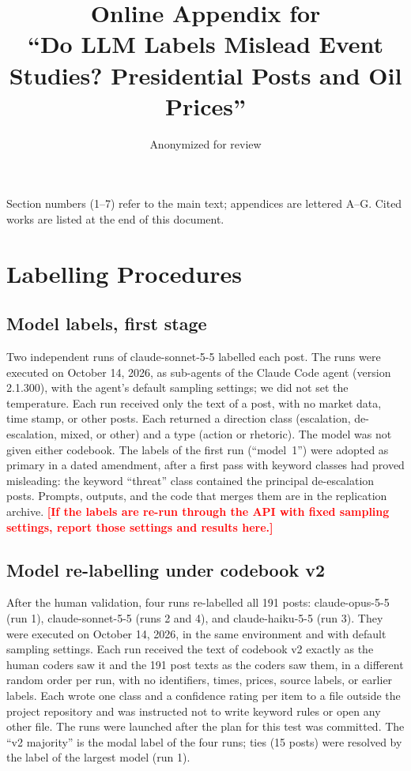 \documentclass[11pt]{article}
\title{Online Appendix for\\ ``Do LLM Labels Mislead Event Studies? Presidential Posts and Oil Prices''}
\author{Anonymized for review}
\date{}
\newcommand{\chk}[1]{\textcolor{red}{\textbf{[#1]}}}
\begin{document}
\maketitle

\noindent Section numbers (1--7) refer to the main text; appendices are lettered A--G. Cited works are listed at the end of this document.

\tableofcontents
\clearpage

\section{Labelling Procedures}

\subsection{Model labels, first stage}

Two independent runs of claude-sonnet-5-5 labelled each post. The runs were executed on October 14, 2026, as sub-agents of the Claude Code agent (version 2.1.300), with the agent's default sampling settings; we did not set the temperature. Each run received only the text of a post, with no market data, time stamp, or other posts. Each returned a direction class (escalation, de-escalation, mixed, or other) and a type (action or rhetoric). The model was not given either codebook. The labels of the first run (``model~1'') were adopted as primary in a dated amendment, after a first pass with keyword classes had proved misleading: the keyword ``threat'' class contained the principal de-escalation posts. Prompts, outputs, and the code that merges them are in the replication archive. \chk{If the labels are re-run through the API with fixed sampling settings, report those settings and results here.}

\subsection{Model re-labelling under codebook v2}

After the human validation, four runs re-labelled all 191 posts: claude-opus-5-5 (run 1), claude-sonnet-5-5 (runs 2 and 4), and claude-haiku-5-5 (run 3). They were executed on October 14, 2026, in the same environment and with default sampling settings. Each run received the text of codebook v2 exactly as the human coders saw it and the 191 post texts as the coders saw them, in a different random order per run, with no identifiers, times, prices, source labels, or earlier labels. Each wrote one class and a confidence rating per item to a file outside the project repository and was instructed not to write keyword rules or open any other file. The runs were launched after the plan for this test was committed. The ``v2 majority'' is the modal label of the four runs; ties (15 posts) were resolved by the label of the largest model (run 1).
\end{document}
